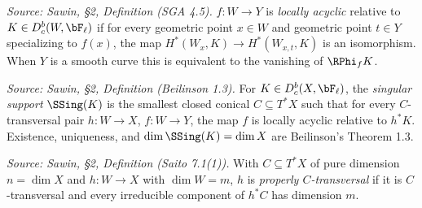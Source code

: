 \begin{definition}
  \label{def:sawin_local_acyclic}
  \textit{Source: Sawin, §2, Definition (SGA 4.5).}
  $f:W\to Y$ is \emph{locally acyclic} relative to $K\in D^b_c(W,\bF_\ell)$ if for
  every geometric point $x\in W$ and geometric point $t\in Y$ specializing to
  $f(x)$, the map $H^*(W_x,K)\to H^*(W_{x,t},K)$ is an isomorphism.  When $Y$ is a
  smooth curve this is equivalent to the vanishing of $\RPhi_f K$.
\end{definition}

\begin{definition}
  \label{def:sawin_singular_support}
  \textit{Source: Sawin, §2, Definition (Beilinson 1.3).}
  For $K\in D^b_c(X,\bF_\ell)$, the \emph{singular support} $\SSing(K)$ is the
  smallest closed conical $C\subseteq T^*X$ such that for every $C$-transversal
  pair $h:W\to X$, $f:W\to Y$, the map $f$ is locally acyclic relative to $h^*K$.
  Existence, uniqueness, and $\dim \SSing(K)=\dim X$ are Beilinson's
  Theorem 1.3.
\end{definition}

\begin{definition}
  \label{def:sawin_properly_transversal}
  \textit{Source: Sawin, §2, Definition (Saito 7.1(1)).}
  With $C\subseteq T^*X$ of pure dimension $n=\dim X$ and $h:W\to X$ with
  $\dim W=m$, $h$ is \emph{properly $C$-transversal} if it is $C$-transversal and
  every irreducible component of $h^*C$ has dimension $m$.
\end{definition}

